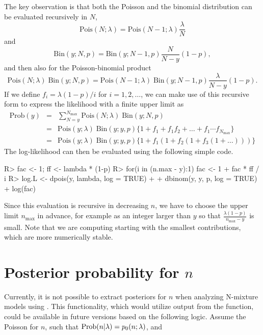 \documentclass[codesnippet]{jss}
\begin{document}
The key observation is that both the Poisson and the binomial distribution can be evaluated recursively in $N$,
\begin{displaymath}
	\text{Pois}(N; \lambda) = \text{Pois}(N-1; \lambda) \frac{\lambda}{N}
\end{displaymath}
and
\begin{displaymath}
	\text{Bin}(y; N, p) = \text{Bin}(y; N-1, p) \frac{N}{N-y}(1-p),
\end{displaymath}
and then also for the Poisson-binomial product
\begin{displaymath}
	\text{Pois}(N ; \lambda) \; \text{Bin}(y; N, p)
	=
	\text{Pois}(N-1; \lambda) \; \text{Bin}(y; N-1, p)
	\frac{\lambda}{N-y}(1-p).
\end{displaymath}
If we define $f_i = \lambda(1-p)/i$ for $i=1, 2, \ldots$, we can make use of this recursive form to express the likelihood with a finite upper limit as
\begin{eqnarray}
	\text{Prob}(y) &=& \sum_{N = y}^{N_{\text{max}}}
	\text{Pois}(N ; \lambda)\;
	\text{Bin}(y; N, p) \nonumber\\
	&=& \text{Pois}(y; \lambda)\; \text{Bin}(y; y, p)
	\Big\{ 1 + f_1 + f_1f_2 +
	\ldots
	+f_1\cdots f_{N_\text{max}}
	\Big\} \nonumber\\
	&=& \text{Pois}(y; \lambda)\; \text{Bin}(y; y, p)
	\Big\{ 1 + f_1(1+f_2(1+f_3(1+ \dots)))\Big\}\nonumber
\end{eqnarray}
The log-likelihood can then be evaluated using the following simple  code.
\begin{CodeInput}
R> fac <- 1; ff <- lambda * (1-p)
R> for(i in (n.max - y):1) fac <- 1 + fac * ff / i
R> log.L <- dpois(y, lambda, log = TRUE) +
+    dbinom(y, y, p, log = TRUE) + log(fac)
\end{CodeInput}
Since this evaluation is recursive in decreasing $n$, we have to choose the upper limit $n_\text{max}$ in advance, for example as an integer larger than $y$ so that $\frac{\lambda (1-p)}{n_\text{max}-y}$ is small. Note that we are computing  starting with the smallest contributions, which are more numerically stable.

\section{Posterior probability for $n$}
Currently, it is not possible to extract posteriors for $n$ when analyzing N-mixture models using . This functionality, which would utilize output from the  function, could be available in future versions based on the following logic. Assume the Poisson for $n$, such that $\textnormal{Prob} (n | \lambda) = p_0(n; \lambda)$, and
\end{document}
